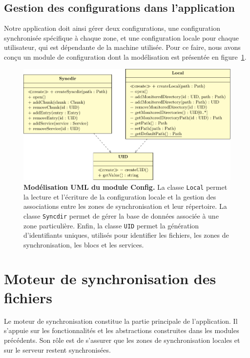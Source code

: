 \subsection{Gestion des configurations dans l'application}

Notre application doit ainsi gérer deux configurations, une configuration synchronisée spécifique à chaque zone, et une configuration locale pour chaque utilisateur, qui est dépendante de la machine utilisée. Pour ce faire, nous avons conçu un module de configuration dont la modélisation est présentée en figure~\ref{fig:conception-config}.

\begin{figure}[h!]
    \centering
    \includegraphics{figures/config}
    \caption{\textbf{Modélisation UML du module Config.} La classe \texttt{Local} permet la lecture et l'écriture de la configuration locale et la gestion des associations entre les zones de synchronisation et leur répertoire. La classe \texttt{Syncdir} permet de gérer la base de données associée à une zone particulière. Enfin, la classe \texttt{UID} permet la génération d'identifiants uniques, utilisés pour identifier les fichiers, les zones de synchronisation, les blocs et les services.}
    \label{fig:conception-config}
\end{figure}

\section{Moteur de synchronisation des fichiers}

Le moteur de synchronisation constitue la partie principale de l'application. Il s'appuie sur les fonctionnalités et les abstractions construites dans les modules précédents. Son rôle est de s'assurer que les zones de synchronisation locales et sur le serveur restent synchronisées.

